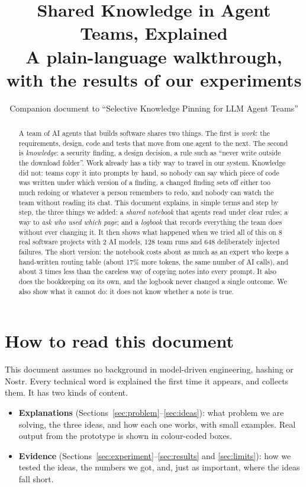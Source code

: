 \documentclass[10pt,a4paper]{article}
\title{Shared Knowledge in Agent Teams, Explained\\[2pt]
\large A plain-language walkthrough, with the results of our experiments}
\author{Companion document to ``Selective Knowledge Pinning for LLM Agent Teams''}
\date{}
\begin{document}
\maketitle

\begin{abstract}
A team of AI agents that builds software shares two things. The first is \emph{work}: the
requirements, design, code and tests that move from one agent to the next. The second is
\emph{knowledge}: a security finding, a design decision, a rule such as ``never write outside the
download folder''. Work already has a tidy way to travel in our system. Knowledge did not: teams
copy it into prompts by hand, so nobody can say which piece of code was written under which version
of a finding, a changed finding sets off either too much redoing or whatever a person remembers to
redo, and nobody can watch the team without reading its chat. This document explains, in simple
terms and step by step, the three things we added: a \emph{shared notebook} that agents read under
clear rules; a way to \emph{ask who used which page}; and a \emph{logbook} that records everything
the team does without ever changing it. It then shows what happened when we tried all of this
on 8 real software projects with 2 AI models, 128 team runs and 648 deliberately injected failures.
The short version: the notebook costs about as much as an expert who keeps a hand-written routing
table (about 17\% more tokens, the same number of AI calls), and about 3 times less than the
careless way of copying notes into every prompt. It also does the bookkeeping on its own, and the
logbook never changed a single outcome. We also show what it cannot do: it does not know whether a
note is true.
\end{abstract}

\tableofcontents

\section{How to read this document}\label{sec:read}

This document assumes no background in model-driven engineering, hashing or Nostr. Every technical
word is explained the first time it appears, and  collects them. It has two kinds
of content.

\begin{itemize}[leftmargin=*]
\item \textbf{Explanations} (Sections~\ref{sec:problem}--\ref{sec:ideas}): what problem we are solving,
      the three ideas, and how each one works, with small examples. Real output from the prototype is shown
      in colour-coded boxes.
\item \textbf{Evidence} (Sections~\ref{sec:experiment}--\ref{sec:results} and \ref{sec:limits}): how we tested the
      ideas, the numbers we got, and, just as important, where the ideas fall short.
\end{itemize}
\end{document}
